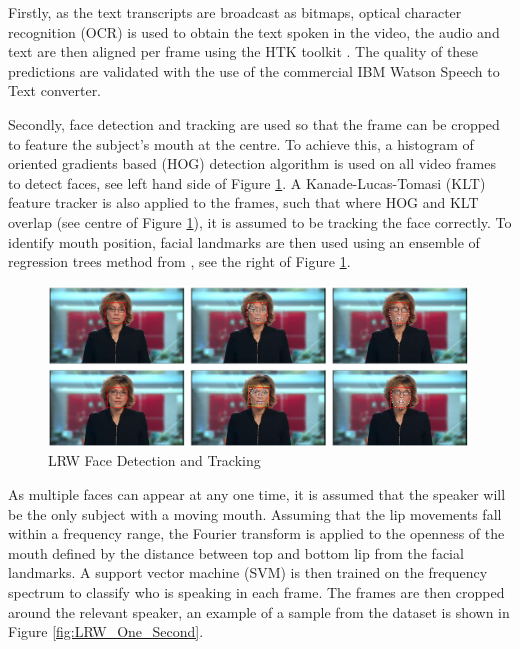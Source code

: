 Firstly, as the text transcripts are broadcast as bitmaps, optical character recognition (OCR) \cite{Buehler2009} is used to obtain the text spoken in the video, the audio and text are then aligned per frame using the HTK toolkit \cite{Woodland1995}.
The quality of these predictions are validated with the use of the commercial IBM Watson Speech to Text converter.

Secondly, face detection and tracking are used so that the frame can be cropped to feature the subject's mouth at the centre.
To achieve this, a histogram of oriented gradients based (HOG) detection algorithm \cite{King2009} is used on all video frames to detect faces, see left hand side of Figure \ref{fig:LRW_Face_Detection}.
A Kanade-Lucas-Tomasi (KLT) feature tracker is also applied to the frames, such that where HOG and KLT overlap (see centre of Figure \ref{fig:LRW_Face_Detection}), it is assumed to be tracking the face correctly.
To identify mouth position, facial landmarks are then used using an ensemble of regression trees method from \cite{Kazemi2014}, see the right of Figure \ref{fig:LRW_Face_Detection}.

\begin{figure}[h]
    \centering
        \includegraphics[width=0.99\textwidth]{figures/lrw_face_detection.png}
    \caption{LRW Face Detection and Tracking \cite{Chung2016}}\label{fig:LRW_Face_Detection}
\end{figure}

As multiple faces can appear at any one time, it is assumed that the speaker will be the only subject with a moving mouth.
Assuming that the lip movements fall within a frequency range, the Fourier transform is applied to the openness of the mouth defined by the distance between top and bottom lip from the facial landmarks.
A support vector machine (SVM) is then trained on the frequency spectrum to classify who is speaking in each frame.
The frames are then cropped around the relevant speaker, an example of a sample from the dataset is shown in Figure \ref{fig:LRW_One_Second}.

